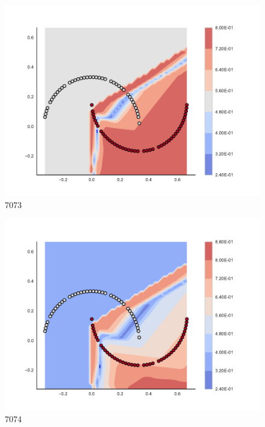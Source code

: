 \begin{subfigure}[b]{0.09\textwidth}
    \includegraphics[clip, trim=2.35cm 1.75cm 4.5cm 0cm,width=\textwidth]{img/convergence/7073.pdf}
    \caption{7073}
    \label{fig:convergence_7073}
\end{subfigure}
%
\begin{subfigure}[b]{0.09\textwidth}
    \includegraphics[clip, trim=2.35cm 1.75cm 4.5cm 0cm,width=\textwidth]{img/convergence/7074.pdf}
    \caption{7074}
    \label{fig:convergence_7074}
\end{subfigure}
%
